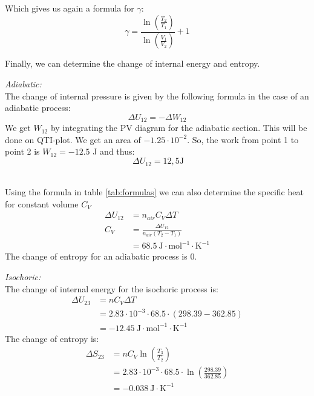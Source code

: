 \documentclass{scrartcl}
\begin{document}

Which gives us again a formula for $\gamma$: 
\begin{equation}
    \gamma = \frac{ \ln \left( \frac{T_2}{T_1} \right)}{\ln{\left( \frac{V_1}{V_2} \right)}} + 1
\end{equation}

Finally, we can determine the change of internal energy and entropy.\vspace{0.3cm}

\textit{Adiabatic:}\\
The change of internal pressure is given by the following formula in the case of an adiabatic process:
\begin{equation}
    \Delta U_{12} = -\Delta W_{12}
\end{equation}
We get $W_{12}$ by integrating the PV diagram for the adiabatic section. This will be done on QTI-plot. We get an area of $-1.25 \cdot 10^{-2}$. So, the work from point 1 to point 2 is $W_{12} = -12.5$ J and thus:
\[\ \boxed{\Delta U_{12} = 12,5 \text{J} } \]\

Using the formula in table \ref{tab:formulas} we can also determine the specific heat for constant volume $C_V$
\begin{align*}
    \Delta U_{12} &= n_{air}C_V\Delta T\\
    C_V &= \frac{\Delta U_{12}}{n_{air}(T_2-T_1)}\\
    &= \boxed{68.5 \ \text{J} \cdot \text{mol}^{-1} \cdot \text{K}^{-1}}
\end{align*}
The change of entropy for an adiabatic process is 0.\vspace{0.3cm}

\textit{Isochoric:}\\
The change of internal energy for the isochoric process is:
    \begin{align*}
        \Delta U_{23} &= nC_V\Delta T\\
        &= 2.83 \cdot 10^{-3} \cdot 68.5\cdot (298.39-362.85)\\
        &= \boxed{-12.45 \ \text{J} \cdot \text{mol}^{-1} \cdot \text{K}^{-1}}
    \end{align*}
The change of entropy is:
    \begin{align*}
        \Delta S_{23} &= nC_V \ln\left(\frac{T_3}{T_2}\right)\\
        &= 2.83 \cdot 10^{-3} \cdot 68.5\cdot \ln\left(\frac{298.39}{362.85}\right)\\
        &= \boxed{-0.038 \ \text{J} \cdot \text{K}^{-1}}
    \end{align*}
\vspace{0.3cm}
\end{document}
